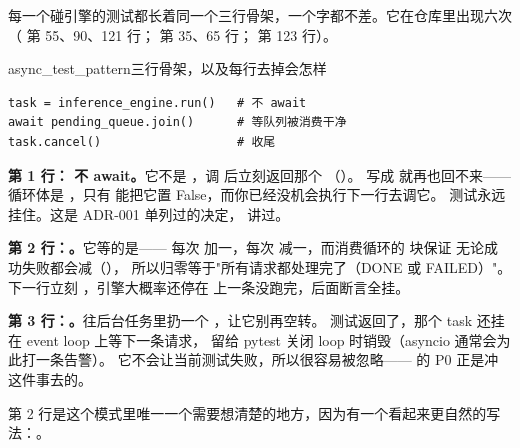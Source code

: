 每一个碰引擎的测试都长着同一个三行骨架，一个字都不差。它在仓库里出现六次
（ 第 55、90、121 行； 第 35、65 行；
 第 123 行）。

\begin{examplebox}{async_test_pattern}{三行骨架，以及每行去掉会怎样}
\begin{lstlisting}[style=hlnum, firstnumber=55]
task = inference_engine.run()   # 不 await
await pending_queue.join()      # 等队列被消费干净
task.cancel()                   # 收尾
\end{lstlisting}

\textbf{第 1 行： 不 await。}它不是 ，调
 后立刻返回那个 
（）。
写成  就再也回不来——循环体是
，只有  能把它置 False，而你已经没机会执行下一行去调它。
测试永远挂住。这是 ADR-001 单列过的决定， 讲过。

\textbf{第 2 行：。}它等的是——
每次  加一，每次  减一，而消费循环的  块保证
无论成功失败都会减（），
所以归零等于"所有请求都处理完了（DONE 或 FAILED）"。
下一行立刻 ，引擎大概率还停在
 上一条没跑完，后面断言全挂。

\textbf{第 3 行：。}往后台任务里扔一个 ，让它别再空转。
测试返回了，那个 task 还挂在 event loop 上等下一条请求，
留给 pytest 关闭 loop 时销毁（asyncio 通常会为此打一条告警）。
它不会让当前测试失败，所以很容易被忽略—— 的 P0 正是冲这件事去的。
\end{examplebox}

第 2 行是这个模式里唯一一个需要想清楚的地方，因为有一个看起来更自然的写法：。

